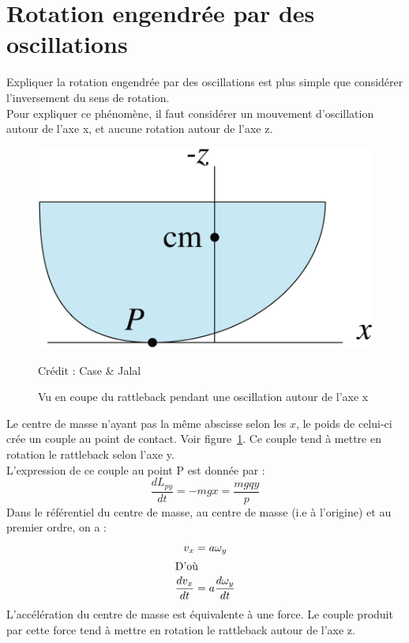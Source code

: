 \documentclass[12pt,a4paper]{article}
\begin{document}
	\section{Rotation engendrée par des oscillations}
	Expliquer la rotation engendrée par des oscillations est plus simple que considérer l'inversement du sens de rotation.\\
	Pour expliquer ce phénomène, il faut considérer un mouvement d'oscillation autour de l'axe x, et aucune rotation autour de l'axe z.
	\begin{figure}
		\centering
		\includegraphics[width=0.7\linewidth]{res/coupe}
		\caption{Vu en coupe du rattleback pendant une oscillation autour de l'axe x}{Crédit : Case \& Jalal}
		\label{fig:coupe}
	\end{figure}
	Le centre de masse n'ayant pas la même abscisse selon les $x$, le poids de celui-ci crée un couple au point de contact. Voir figure~\ref{fig:coupe}. Ce couple tend à mettre en rotation le rattleback selon l'axe y.\\
	L'expression de ce couple au point P est donnée par :
	\begin{equation}
	\dfrac{dL_{py}}{dt}=-mgx=\dfrac{mgqy}{p}
	\end{equation}
	Dans le référentiel du centre de masse, au centre de masse (i.e à l'origine) et au premier ordre, on a :
	\begin{align}
	v_x&=a \omega_y\\
	\intertext{D'où}
	\dfrac{dv_x}{dt}&=a\dfrac{d\omega_y}{dt}
	\end{align}
	L'accélération du centre de masse est équivalente à une force.
	Le couple produit par cette force tend à mettre en rotation le rattleback autour de l'axe z.\\
	
\end{document}
